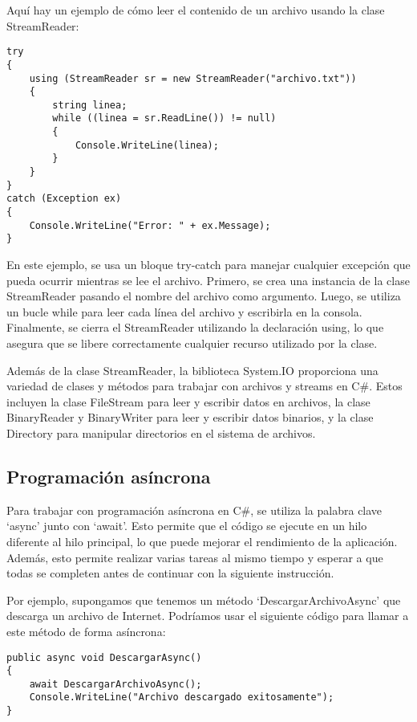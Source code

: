 \documentclass[executivepaper]{article}
\begin{document}
Aquí hay un ejemplo de cómo leer el contenido de un archivo usando la clase StreamReader:
\begin{lstlisting}
try
{
    using (StreamReader sr = new StreamReader("archivo.txt"))
    {
        string linea;
        while ((linea = sr.ReadLine()) != null)
        {
            Console.WriteLine(linea);
        }
    }
}
catch (Exception ex)
{
    Console.WriteLine("Error: " + ex.Message);
}
\end{lstlisting}

En este ejemplo, se usa un bloque try-catch para manejar cualquier excepción que pueda ocurrir mientras se lee el archivo. Primero, se crea una instancia de la clase StreamReader pasando el nombre del archivo como argumento. Luego, se utiliza un bucle while para leer cada línea del archivo y escribirla en la consola. Finalmente, se cierra el StreamReader utilizando la declaración using, lo que asegura que se libere correctamente cualquier recurso utilizado por la clase.

Además de la clase StreamReader, la biblioteca System.IO proporciona una variedad de clases y métodos para trabajar con archivos y streams en C\#. Estos incluyen la clase FileStream para leer y escribir datos en archivos, la clase BinaryReader y BinaryWriter para leer y escribir datos binarios, y la clase Directory para manipular directorios en el sistema de archivos.

\subsection{Programación asíncrona}

Para trabajar con programación asíncrona en C\#, se utiliza la palabra clave \enquote*{async} junto con \enquote*{await}. Esto permite que el código se ejecute en un hilo diferente al hilo principal, lo que puede mejorar el rendimiento de la aplicación. Además, esto permite realizar varias tareas al mismo tiempo y esperar a que todas se completen antes de continuar con la siguiente instrucción.

Por ejemplo, supongamos que tenemos un método \enquote*{DescargarArchivoAsync} que descarga un archivo de Internet. Podríamos usar el siguiente código para llamar a este método de forma asíncrona:

\begin{lstlisting}
public async void DescargarAsync()
{
    await DescargarArchivoAsync();
    Console.WriteLine("Archivo descargado exitosamente");
}
\end{lstlisting}
\end{document}
